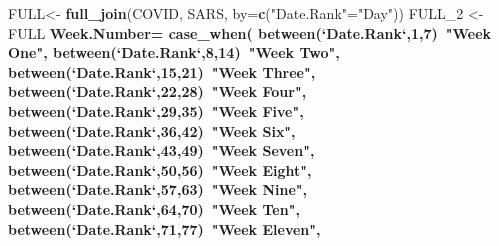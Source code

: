 \documentclass[
]{article}
\newenvironment{Shaded}{\begin{snugshade}}{\end{snugshade}}
\newcommand{\DataTypeTok}[1]{\textcolor[rgb]{0.13,0.29,0.53}{#1}}
\newcommand{\DecValTok}[1]{\textcolor[rgb]{0.00,0.00,0.81}{#1}}
\newcommand{\KeywordTok}[1]{\textcolor[rgb]{0.13,0.29,0.53}{\textbf{#1}}}
\newcommand{\NormalTok}[1]{#1}
\newcommand{\OperatorTok}[1]{\textcolor[rgb]{0.81,0.36,0.00}{\textbf{#1}}}
\newcommand{\StringTok}[1]{\textcolor[rgb]{0.31,0.60,0.02}{#1}}
\begin{document}
\begin{Shaded}
\begin{Highlighting}[]
\NormalTok{FULL<-}\StringTok{ }\KeywordTok{full_join}\NormalTok{(COVID, SARS, }\DataTypeTok{by=}\KeywordTok{c}\NormalTok{(}\StringTok{"Date.Rank"}\NormalTok{=}\StringTok{"Day"}\NormalTok{))}
\NormalTok{FULL_}\DecValTok{2}\NormalTok{ <-FULL}\OperatorTok{%
  \DataTypeTok{Week.Number=} \KeywordTok{case_when}\NormalTok{(}
    \KeywordTok{between}\NormalTok{(}\StringTok{`}\DataTypeTok{Date.Rank}\StringTok{`}\NormalTok{,}\DecValTok{1}\NormalTok{,}\DecValTok{7}\NormalTok{)}\OperatorTok{~}\StringTok{"Week One"}\NormalTok{,}
    \KeywordTok{between}\NormalTok{(}\StringTok{`}\DataTypeTok{Date.Rank}\StringTok{`}\NormalTok{,}\DecValTok{8}\NormalTok{,}\DecValTok{14}\NormalTok{)}\OperatorTok{~}\StringTok{"Week Two"}\NormalTok{,}
    \KeywordTok{between}\NormalTok{(}\StringTok{`}\DataTypeTok{Date.Rank}\StringTok{`}\NormalTok{,}\DecValTok{15}\NormalTok{,}\DecValTok{21}\NormalTok{)}\OperatorTok{~}\StringTok{"Week Three"}\NormalTok{,}
    \KeywordTok{between}\NormalTok{(}\StringTok{`}\DataTypeTok{Date.Rank}\StringTok{`}\NormalTok{,}\DecValTok{22}\NormalTok{,}\DecValTok{28}\NormalTok{)}\OperatorTok{~}\StringTok{"Week Four"}\NormalTok{,}
    \KeywordTok{between}\NormalTok{(}\StringTok{`}\DataTypeTok{Date.Rank}\StringTok{`}\NormalTok{,}\DecValTok{29}\NormalTok{,}\DecValTok{35}\NormalTok{)}\OperatorTok{~}\StringTok{"Week Five"}\NormalTok{,}
    \KeywordTok{between}\NormalTok{(}\StringTok{`}\DataTypeTok{Date.Rank}\StringTok{`}\NormalTok{,}\DecValTok{36}\NormalTok{,}\DecValTok{42}\NormalTok{)}\OperatorTok{~}\StringTok{"Week Six"}\NormalTok{,}
    \KeywordTok{between}\NormalTok{(}\StringTok{`}\DataTypeTok{Date.Rank}\StringTok{`}\NormalTok{,}\DecValTok{43}\NormalTok{,}\DecValTok{49}\NormalTok{)}\OperatorTok{~}\StringTok{"Week Seven"}\NormalTok{,}
    \KeywordTok{between}\NormalTok{(}\StringTok{`}\DataTypeTok{Date.Rank}\StringTok{`}\NormalTok{,}\DecValTok{50}\NormalTok{,}\DecValTok{56}\NormalTok{)}\OperatorTok{~}\StringTok{"Week Eight"}\NormalTok{,}
    \KeywordTok{between}\NormalTok{(}\StringTok{`}\DataTypeTok{Date.Rank}\StringTok{`}\NormalTok{,}\DecValTok{57}\NormalTok{,}\DecValTok{63}\NormalTok{)}\OperatorTok{~}\StringTok{"Week Nine"}\NormalTok{,}
    \KeywordTok{between}\NormalTok{(}\StringTok{`}\DataTypeTok{Date.Rank}\StringTok{`}\NormalTok{,}\DecValTok{64}\NormalTok{,}\DecValTok{70}\NormalTok{)}\OperatorTok{~}\StringTok{"Week Ten"}\NormalTok{,}
    \KeywordTok{between}\NormalTok{(}\StringTok{`}\DataTypeTok{Date.Rank}\StringTok{`}\NormalTok{,}\DecValTok{71}\NormalTok{,}\DecValTok{77}\NormalTok{)}\OperatorTok{~}\StringTok{"Week Eleven"}\NormalTok{,}
}
\end{Highlighting}
\end{Shaded}
\end{document}
